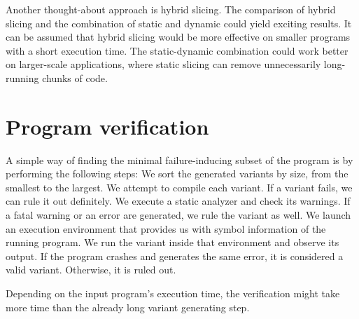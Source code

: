 Another thought-about approach is hybrid slicing.
The comparison of hybrid slicing and the combination of static and dynamic 
could yield exciting results.
It can be assumed that hybrid slicing would be more effective on smaller 
programs with a short execution time.
The static-dynamic combination could work better on larger-scale 
applications, where static slicing can remove unnecessarily long-running 
chunks of code.


\section{Program verification}\label{chap:verification}



A simple way of finding the minimal failure-inducing subset of the program is by performing the following steps:
We sort the generated variants by size, from the smallest to the largest.
We attempt to compile each variant. If a variant fails, we can rule it out definitely.
We execute a static analyzer and check its warnings. If a fatal warning or an error are generated, we rule the variant as well.
We launch an execution environment that provides us with symbol information of the running program. We run the variant inside that environment and observe its output. If the program crashes and generates the same error, it is considered a valid variant. Otherwise, it is ruled out.

Depending on the input program's execution time, the verification might take 
more time than the already long variant generating step.